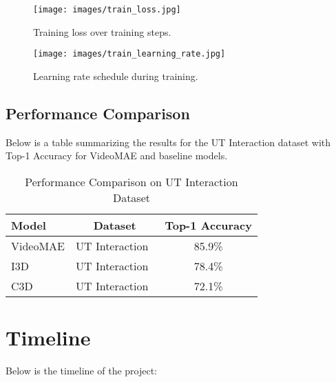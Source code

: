 \documentclass[runningheads]{llncs}
\begin{document}
	
	\begin{figure}[ht]
		\centering
		\texttt{[image: images/train\_loss.jpg]}
		\caption{Training loss over training steps.}
		\label{fig:train_loss}
	\end{figure}
	
	\begin{figure}[ht]
		\centering
		\texttt{[image: images/train\_learning\_rate.jpg]}
		\caption{Learning rate schedule during training.}
		\label{fig:train_learning_rate}
	\end{figure}
	

	
	\subsection{Performance Comparison} \label{sec:comparison}
	Below is a table summarizing the results for the UT Interaction dataset with Top-1 Accuracy for VideoMAE and baseline models.
	
	\begin{table*}[htbp]
		\caption{Performance Comparison on UT Interaction Dataset}
		\centering
		\begin{tabular}{@{}lcc@{}}
			\toprule
			\textbf{Model} & \textbf{Dataset} & \textbf{Top-1 Accuracy} \\ \midrule
			VideoMAE & UT Interaction~\cite{utdataset} & 85.9\% \\ 
			I3D & UT Interaction~\cite{utdataset} & 78.4\% \\ 
			C3D & UT Interaction~\cite{utdataset} & 72.1\% \\ 
			\bottomrule
		\end{tabular}
		\label{tab:performance_comparison}
	\end{table*}
	
	
	
	
	\section{Timeline}
	Below is the timeline of the project:
	
	
\end{document}
